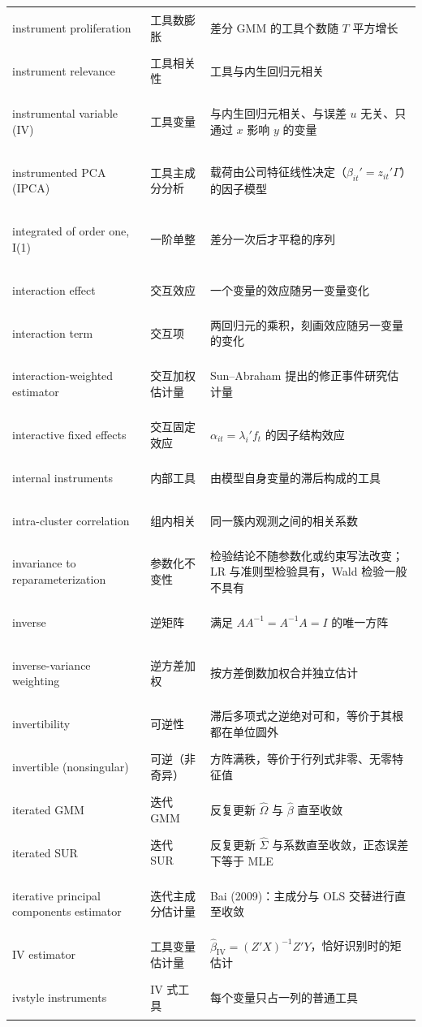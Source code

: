 \begin{longtable}{@{}>{\bfseries\boldmath\raggedright\arraybackslash}p{4.6cm}>{\raggedright\arraybackslash}p{3.2cm}>{\raggedright\arraybackslash}p{\dimexpr\textwidth-7.8cm-4\tabcolsep\relax}@{}}
instrument proliferation & 工具数膨胀 & 差分 GMM 的工具个数随 $T$ 平方增长 \\
instrument relevance & 工具相关性 & 工具与内生回归元相关 \\
instrumental variable (IV) & 工具变量 & 与内生回归元相关、与误差 $u$ 无关、只通过 $x$ 影响 $y$ 的变量 \\
instrumented PCA (IPCA) & 工具主成分分析 & 载荷由公司特征线性决定（$\beta_{it}'=z_{it}'\Gamma$）的因子模型 \\
integrated of order one, I(1) & 一阶单整 & 差分一次后才平稳的序列 \\
interaction effect & 交互效应 & 一个变量的效应随另一变量变化 \\
interaction term & 交互项 & 两回归元的乘积，刻画效应随另一变量的变化 \\
interaction-weighted estimator & 交互加权估计量 & Sun--Abraham 提出的修正事件研究估计量 \\
interactive fixed effects & 交互固定效应 & $\alpha_{it}=\lambda_i'f_t$ 的因子结构效应 \\
internal instruments & 内部工具 & 由模型自身变量的滞后构成的工具 \\
intra-cluster correlation & 组内相关 & 同一簇内观测之间的相关系数 \\
invariance to reparameterization & 参数化不变性 & 检验结论不随参数化或约束写法改变；LR 与准则型检验具有，Wald 检验一般不具有 \\
inverse & 逆矩阵 & 满足 $AA^{-1}=A^{-1}A=I$ 的唯一方阵 \\
inverse-variance weighting & 逆方差加权 & 按方差倒数加权合并独立估计 \\
invertibility & 可逆性 & 滞后多项式之逆绝对可和，等价于其根都在单位圆外 \\
invertible (nonsingular) & 可逆（非奇异） & 方阵满秩，等价于行列式非零、无零特征值 \\
iterated GMM & 迭代 GMM & 反复更新 $\hat\Omega$ 与 $\hat\beta$ 直至收敛 \\
iterated SUR & 迭代 SUR & 反复更新 $\hat\Sigma$ 与系数直至收敛，正态误差下等于 MLE \\
iterative principal components estimator & 迭代主成分估计量 & Bai (2009)：主成分与 OLS 交替进行直至收敛 \\
IV estimator & 工具变量估计量 & $\hat\beta_{\mathrm{IV}}=(Z'X)^{-1}Z'Y$，恰好识别时的矩估计 \\
ivstyle instruments & IV 式工具 & 每个变量只占一列的普通工具 \\
\end{longtable}

